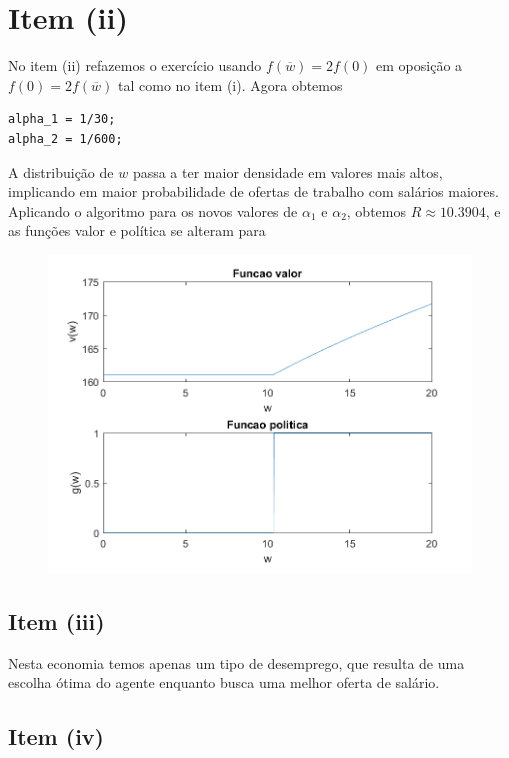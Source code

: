 \documentclass{article}
\begin{document}
\section*{Item (ii)}

No item (ii) refazemos o exercício usando $f(\overline{w}) = 2f(0)$ em oposição a $f(0) = 2f(\overline{w})$ tal como no item (i).
Agora obtemos 

\begin{lstlisting}
alpha_1 = 1/30;
alpha_2 = 1/600;
\end{lstlisting}

A distribuição de $w$ passa a ter maior densidade em valores mais altos,
implicando em maior probabilidade de ofertas de trabalho com salários maiores.
Aplicando o algoritmo para os novos valores de  $\alpha_1$ e $\alpha_2$, 
obtemos $R \approx 10.3904$, e as funções valor e política se alteram para

\begin{figure}[!h]
  \includegraphics[scale=0.6]{ex1/ex1_2.png}
\end{figure}

\subsection*{Item (iii)}

Nesta economia temos apenas um tipo de desemprego, que resulta de uma escolha ótima do agente
enquanto busca uma melhor oferta de salário.

\subsection*{Item (iv)}
\end{document}
